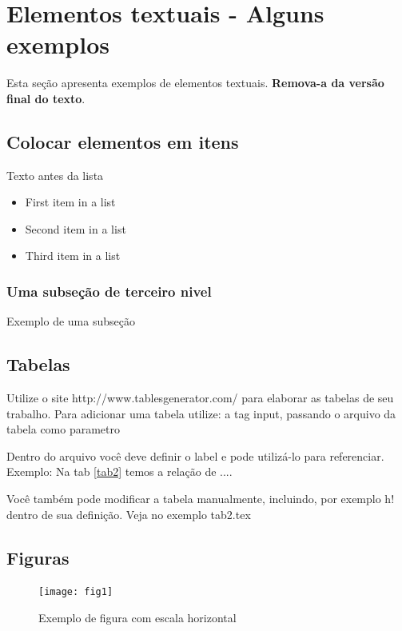 \documentclass[	DIV=calc,%
							paper=a4,%
							fontsize=12pt,%
							onecolumn]{scrartcl}	 					%
\begin{document}
\section{Elementos textuais - Alguns exemplos}

Esta seção apresenta exemplos de elementos textuais. \textbf{Remova-a da versão final do texto}.


\subsection{Colocar elementos em itens}

Texto antes da lista

\begin{itemize}
	\item First item in a list 
	\item Second item in a list 
	\item Third item in a list
\end{itemize}

\subsubsection{Uma subseção de terceiro nivel}

Exemplo de uma subseção

\subsection{Tabelas}

Utilize o site http://www.tablesgenerator.com/ para elaborar as tabelas de seu trabalho.
Para adicionar uma tabela utilize: a tag input, passando o arquivo da tabela como parametro



Dentro do arquivo você deve definir o label e pode utilizá-lo para referenciar. Exemplo:
Na tab \ref{tab2} temos a relação de ....


Você também pode modificar a tabela manualmente, incluindo, por exemplo h! dentro de sua definição. Veja no exemplo tab2.tex

\subsection{Figuras}



\begin{figure}
\centering
\texttt{[image: fig1]}
\caption{Exemplo de figura com escala horizontal}
\label{fig1}
\end{figure}
\end{document}
